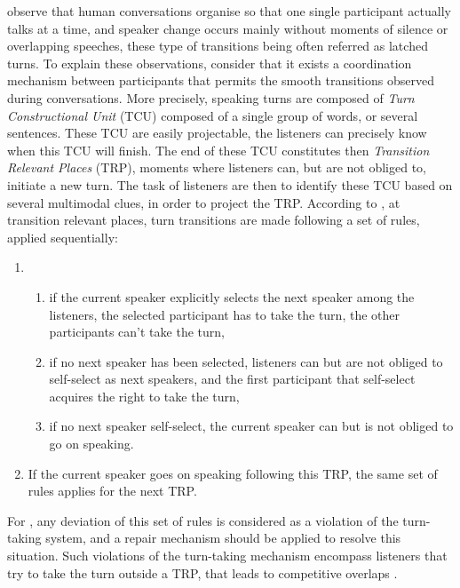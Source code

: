 \citep{sacks_simplest_1974} observe that human conversations organise so that one single participant actually talks at a time, and speaker change occurs mainly without moments of silence or overlapping speeches, these type of transitions being often referred as latched turns. 
To explain these observations, \citep{sacks_simplest_1974} consider that it exists a coordination mechanism between participants that permits the smooth transitions observed during conversations. More precisely, speaking turns are composed of \textit{Turn Constructional Unit} (TCU) composed of a single group of words, or several sentences. These TCU are easily projectable, the listeners can precisely know when this TCU will finish. The end of these TCU constitutes then \textit{Transition Relevant Places} (TRP), moments where listeners can, but are not obliged to, initiate a new turn. The task of listeners are then to identify these TCU based on several multimodal clues, in order to project the TRP. 
According to \citep{sacks_simplest_1974}, at transition relevant places, turn transitions are made following a set of rules, applied sequentially: 
\begin{enumerate}
\item \begin{enumerate}
  \item if the current speaker explicitly selects the next speaker among the listeners, the selected participant has to take the turn, the other participants can't take the turn,
  \item if no next speaker has been selected, listeners can but are not obliged to self-select as next speakers, and the first participant that self-select acquires the right to take the turn,
  \item if no next speaker self-select, the current speaker can but is not obliged to go on speaking.
  \end{enumerate}
\item If the current speaker goes on speaking following this TRP, the same set of rules applies for the next TRP.
\end{enumerate}

For \citep{sacks_simplest_1974}, any deviation of this set of rules is considered as a violation of the turn-taking system, and a repair mechanism should be applied to resolve this situation. Such violations of the turn-taking mechanism encompass listeners that try to take the turn outside a TRP, that leads to competitive overlaps \citep{schegloff_overlapping_2000}. 

